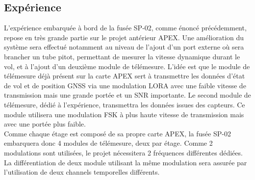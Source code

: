 \subsection{Expérience}
\label{subsec:experience}

L'expérience embarquée à bord de la fusée SP-02, comme énoncé précédemment, repose en très grande partie sur le projet antérieur
\gls{APEX}. Une amélioration du système sera effectué notamment au niveau de l'ajout d'un port externe où sera brancher un tube
pitot, permettant de mesurer la vitesse dynamique durant le vol, et à l'ajout d'un deuxième module de télémesure. L'idée est que
le module de télémesure déjà présent sur la carte \gls{APEX} sert à transmettre les données d'état de vol et de position
\acrshort{GNSS} via une modulation \acrshort{LORA} avec une faible vitesse de transmission mais une grande portée et un
\acrshort{SNR} importante. Le second module de télémesure, dédié à l'expérience, transmettra les données issues des capteurs.
Ce module utilisera une modulation \acrshort{FSK} à plus haute vitesse de transmission mais avec une portée plus faible.\\

Comme chaque étage est composé de sa propre carte \gls{APEX}, la fusée SP-02 embarquera donc 4 modules de télémesure, deux par
étage. Comme 2 modulations sont utilisées, le projet nécessitera 2 fréquences différentes dédiées. La différentiation de deux
module utilisant la même modulation sera assurée par l'utilisation de deux channels temporelles différents.\\

\newpage
